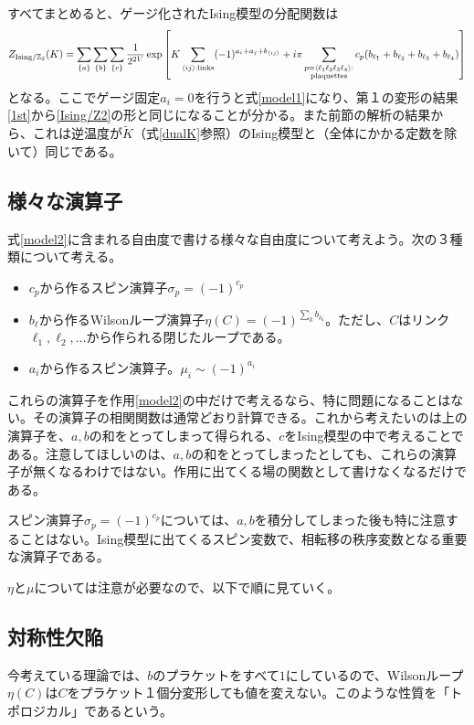 \documentclass[a4paper,12pt,dvipdfmx]{jlreq}
\newcommand{\Kt}{\widetilde{K}}
\newcommand{\ZGIs}{Z_{\mathrm{Ising}/\mathbb{Z}_2}}
\begin{document}
すべてまとめると、ゲージ化されたIsing模型の分配関数は
\begin{align}
  \ZGIs(K)=\sum_{\{a\}}\sum_{\{b\}}\sum_{\{c\}}\frac{1}{2^{2V}} \exp\left[
    K\sum_{\expval{ij}:\text{links}}(-1)^{a_i+a_j+b_{\expval{ij}}}+i\pi\sum_{\substack{p=\expval{\ell_1 \ell_2 \ell_3 \ell_4}:\\ \text{plaquettes}}} c_{p}(b_{\ell_1}+b_{\ell_2}+b_{\ell_3}+b_{\ell_4})
  \right]
  \label{model2}
\end{align}
となる。ここでゲージ固定$a_{i}=0$を行うと式\eqref{model1}になり、第１の変形の結果\eqref{1st}から\eqref{Ising/Z2}の形と同じになることが分かる。また前節の解析の結果から、これは逆温度が$\Kt$（式\eqref{dualK}参照）のIsing模型と（全体にかかる定数を除いて）同じである。

\subsection{様々な演算子}
式\eqref{model2}に含まれる自由度で書ける様々な自由度について考えよう。次の３種類について考える。
\begin{itemize}
  \item $c_p$から作るスピン演算子$\sigma_{p}=(-1)^{c_p}$
  \item $b_{\ell}$から作るWilsonループ演算子$\eta(C)=(-1)^{\sum_{k}b_{\ell_k}}$。ただし、$C$はリンク$\ell_1,\ell_2,\dots$から作られる閉じたループである。
  \item $a_i$から作るスピン演算子。$\mu_{i}\sim (-1)^{a_i}$
\end{itemize}

これらの演算子を作用\eqref{model2}の中だけで考えるなら、特に問題になることはない。その演算子の相関関数は通常どおり計算できる。これから考えたいのは上の演算子を、$a,b$の和をとってしまって得られる、$c$をIsing模型の中で考えることである。注意してほしいのは、$a,b$の和をとってしまったとしても、これらの演算子が無くなるわけではない。作用に出てくる場の関数として書けなくなるだけである。

スピン演算子$\sigma_{p}=(-1)^{c_p}$については、$a,b$を積分してしまった後も特に注意することはない。Ising模型に出てくるスピン変数で、相転移の秩序変数となる重要な演算子である。

$\eta$と$\mu$については注意が必要なので、以下で順に見ていく。


\subsection{対称性欠陥}

今考えている理論では、$b$のプラケットをすべて$1$にしているので、Wilsonループ$\eta(C)$は$C$をプラケット１個分変形しても値を変えない。このような性質を「トポロジカル」であるという。
\end{document}
